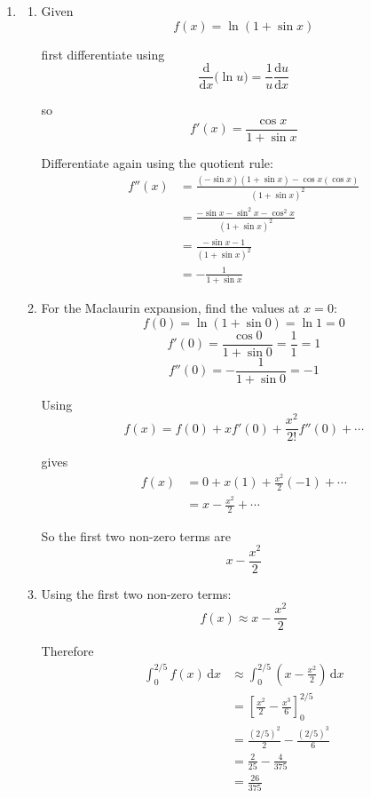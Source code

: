 \documentclass[leqno]{article}
\begin{document}
\begin{enumerate}[
  label=\textbf{\arabic*.},
  leftmargin=*,
  topsep=0pt,
  partopsep=0pt,
  parsep=0pt
]
\vspace*{10pt}

\begin{djsSolution}
\begin{enumerate}[label=\textbf{(\alph*)}]
  \item
  \begin{enumerate}[label=(\roman*)]
    \item
    Given
    \[
    f(x)=\ln(1+\sin x)
    \]

    first differentiate using
    \[
    \frac{\mathrm{d}}{\mathrm{d}x}\bigl(\ln u\bigr)=\frac{1}{u}\frac{\mathrm{d}u}{\mathrm{d}x}
    \]

    so
    \[
    f'(x)=\frac{\cos x}{1+\sin x}
    \]

    Differentiate again using the quotient rule:
    \begin{align*}
    f''(x)
    &=\frac{(-\sin x)(1+\sin x)-\cos x(\cos x)}{(1+\sin x)^2} \\
    &=\frac{-\sin x-\sin^2x-\cos^2x}{(1+\sin x)^2} \\
    &=\frac{-\sin x-1}{(1+\sin x)^2} \\
    &=-\frac{1}{1+\sin x}
    \end{align*}

    \item
    For the Maclaurin expansion, find the values at \(x=0\):
    \[
    f(0)=\ln(1+\sin 0)=\ln 1=0
    \]
    \[
    f'(0)=\frac{\cos 0}{1+\sin 0}=\frac{1}{1}=1
    \]
    \[
    f''(0)=-\frac{1}{1+\sin 0}=-1
    \]

    Using
    \[
    f(x)=f(0)+xf'(0)+\frac{x^2}{2!}f''(0)+\cdots
    \]

    gives
    \begin{align*}
    f(x)
    &=0+x(1)+\frac{x^2}{2}(-1)+\cdots \\
    &=x-\frac{x^2}{2}+\cdots
    \end{align*}

    So the first two non-zero terms are
    \[
    x-\frac{x^2}{2}
    \]

    \item
    Using the first two non-zero terms:
    \[
    f(x)\approx x-\frac{x^2}{2}
    \]

    Therefore
    \begin{align*}
    \int_0^{2/5} f(x)\,\mathrm{d}x
    &\approx \int_0^{2/5}\left(x-\frac{x^2}{2}\right)\,\mathrm{d}x \\
    &=\left[\frac{x^2}{2}-\frac{x^3}{6}\right]_0^{2/5} \\
    &=\frac{(2/5)^2}{2}-\frac{(2/5)^3}{6} \\
    &=\frac{2}{25}-\frac{4}{375} \\
    &=\frac{26}{375}
    \end{align*}


\end{enumerate}
\end{enumerate}
\end{djsSolution}
\end{enumerate}
\end{document}
